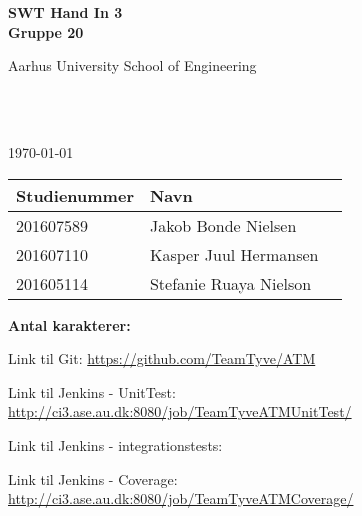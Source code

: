 \begin{center}
	{\fontsize{36pt}{0}\selectfont
		\textbf{
		SWT Hand In 3\\
		Gruppe 20\\
		}
	}
	\vspace{20pt}

	{\fontsize{14pt}{0}\selectfont
		Aarhus University School of Engineering\\
	}
	\vspace{20pt}

	{\fontsize{24pt}{0}\selectfont
		\thetitle\\
	}
	\vspace{20pt}

	{\fontsize{18pt}{0}\selectfont
		\ifdefined\frontpageDate
			\frontpageDate\\
		\else
			\today\\
		\fi
	}
	\vspace{20pt}

	\vspace{5pt}
	\begin{tabular}{|l|l|l|}
		\hline
		\rowcolor{gray!50}
		\textbf{Studienummer} & \textbf{Navn}\\ [5px]
		\hline
		201607589 & Jakob Bonde Nielsen\\
		\hline
		201607110 & Kasper Juul Hermansen\\
		\hline
		201605114 & Stefanie Ruaya Nielson\\
		\hline
	\end{tabular}


	\ifdefined\frontpageCharacters
		\vspace{10pt}
		\textbf{Antal karakterer: } \frontpageCharacters\\
	\fi
	\vspace{30pt}

\end{center}

Link til Git: \url{https://github.com/TeamTyve/ATM} \newline

Link til Jenkins - UnitTest: \url{http://ci3.ase.au.dk:8080/job/TeamTyveATMUnitTest/} \newline

Link til Jenkins - integrationstests: \newline 

Link til Jenkins - Coverage: \url{http://ci3.ase.au.dk:8080/job/TeamTyveATMCoverage/} 

